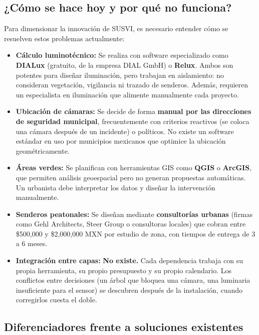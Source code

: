\documentclass[12pt,a4paper]{article}
\begin{document}
\subsection{¿Cómo se hace hoy y por qué no funciona?}

Para dimensionar la innovación de SUSVI, es necesario entender cómo se resuelven estos problemas actualmente:

\begin{itemize}[leftmargin=1.5cm]
    \item \textbf{Cálculo luminotécnico:} Se realiza con software especializado como \textbf{DIALux} (gratuito, de la empresa DIAL GmbH) o \textbf{Relux}. Ambos son potentes para diseñar iluminación, pero trabajan en aislamiento: no consideran vegetación, vigilancia ni trazado de senderos. Además, requieren un especialista en iluminación que alimente manualmente cada proyecto.
    
    \item \textbf{Ubicación de cámaras:} Se decide de forma \textbf{manual por las direcciones de seguridad municipal}, frecuentemente con criterios reactivos (se coloca una cámara después de un incidente) o políticos. No existe un software estándar en uso por municipios mexicanos que optimice la ubicación geométricamente.
    
    \item \textbf{Áreas verdes:} Se planifican con herramientas GIS como \textbf{QGIS} o \textbf{ArcGIS}, que permiten análisis geoespacial pero no generan propuestas automáticas. Un urbanista debe interpretar los datos y diseñar la intervención manualmente.
    
    \item \textbf{Senderos peatonales:} Se diseñan mediante \textbf{consultorías urbanas} (firmas como Gehl Architects, Steer Group o consultoras locales) que cobran entre \$500,000 y \$2,000,000 MXN por estudio de zona, con tiempos de entrega de 3 a 6 meses.
    
    \item \textbf{Integración entre capas:} \textbf{No existe.} Cada dependencia trabaja con su propia herramienta, su propio presupuesto y su propio calendario. Los conflictos entre decisiones (un árbol que bloquea una cámara, una luminaria insuficiente para el sensor) se descubren después de la instalación, cuando corregirlos cuesta el doble.
\end{itemize}

\subsection{Diferenciadores frente a soluciones existentes}
\end{document}
